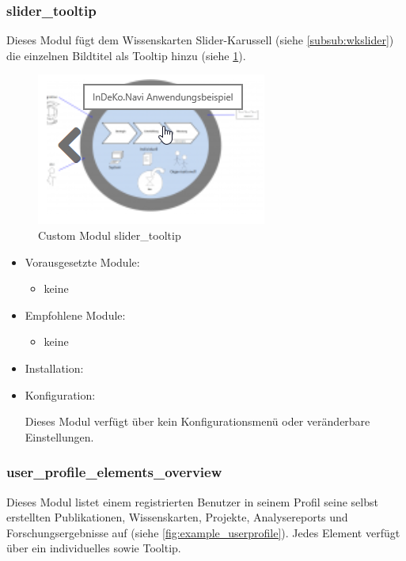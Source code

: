 \newpage
\subsubsection{slider\_tooltip}\label{subsub:slidertooltip}
Dieses Modul fügt dem Wissenskarten Slider-Karussell (siehe \cref{subsub:wkslider}) die einzelnen Bildtitel als Tooltip hinzu (siehe \cref{fig:example_slidertooltip}). 

\begin{figure}[H]
	\centering
	\includegraphics[height=0.10\textheight]{images/example_slidertooltip}
	\caption{Custom Modul slider\_tooltip}
	\label{fig:example_slidertooltip}
\end{figure}

\begin{itemize}[parsep=0pt, itemsep=5.0pt plus 2.0pt minus 1.0pt, leftmargin=*]
	\item Vorausgesetzte Module:
	\begin{itemize}
		\item keine
	\end{itemize}
	
	\item Empfohlene Module:
	\begin{itemize}
		\item keine
	\end{itemize}
	
	\item Installation: 
	
	\standardinstall
	
	
	\item Konfiguration:
	
	Dieses Modul verfügt über kein Konfigurationsmenü oder veränderbare Einstellungen.	
\end{itemize}



\subsubsection{user\_profile\_elements\_overview}\label{subsub:userprofileelementsoverview}
Dieses Modul listet einem registrierten Benutzer in seinem Profil seine selbst erstellten Publikationen, Wissenskarten, Projekte, Analysereports und Forschungsergebnisse auf (siehe \cref{fig:example_userprofile}). Jedes Element verfügt über ein individuelles sowie Tooltip.

